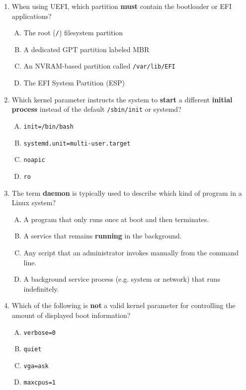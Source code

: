 \documentclass[12pt,a4paper]{report}
\begin{document}
\begin{enumerate}[1.]
    \item When using UEFI, which partition \textbf{must} contain the bootloader or EFI applications?
      \begin{enumerate}[A)]
        \item The root (\texttt{/}) filesystem partition
        \item A dedicated GPT partition labeled \textquotedbl{}MBR\textquotedbl{}
        \item An NVRAM-based partition called \texttt{/var/lib/EFI}
        \item The EFI System Partition (ESP)
      \end{enumerate}
    
    \item Which kernel parameter instructs the system to \textbf{start} a different \textbf{initial process} instead of the default \texttt{/sbin/init} or systemd?
      \begin{enumerate}[A)]
        \item \texttt{init=/bin/bash}
        \item \texttt{systemd.unit=multi-user.target}
        \item \texttt{noapic}
        \item \texttt{ro}
      \end{enumerate}
    
    \item The term \textbf{daemon} is typically used to describe which kind of program in a Linux system?
      \begin{enumerate}[A)]
        \item A program that only runs once at boot and then terminates.
        \item A service that remains \textbf{running} in the background.
        \item Any script that an administrator invokes manually from the command line.
        \item A background service process (e.g. system or network) that runs indefinitely.
      \end{enumerate}
    
    \item Which of the following is \textbf{not} a valid kernel parameter for controlling the amount of displayed boot information?
      \begin{enumerate}[A)]
        \item \texttt{verbose=0}
        \item \texttt{quiet}
        \item \texttt{vga=ask}
        \item \texttt{maxcpus=1}
      \end{enumerate}
    

\end{enumerate}
\end{document}
